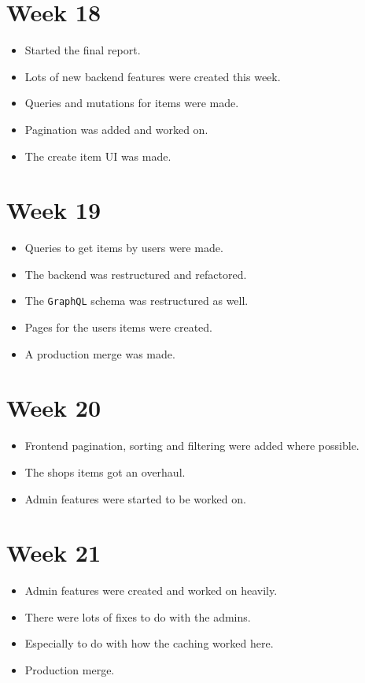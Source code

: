 \documentclass[]{project_report}
\begin{document}
\section{Week 18}
\begin{itemize}
    \item Started the final report.
    \item Lots of new backend features were created this week.
    \item Queries and mutations for items were made.
    \item Pagination was added and worked on.
    \item The create item UI was made.
\end{itemize}

\section{Week 19}
\begin{itemize}
    \item Queries to get items by users were made.
    \item The backend was restructured and refactored.
    \item The \texttt{GraphQL} schema was restructured as well.
    \item Pages for the users items were created.
    \item A production merge was made.
\end{itemize}

\section{Week 20}
\begin{itemize}
    \item Frontend pagination, sorting and filtering were added where possible.
    \item The shops items got an overhaul.
    \item Admin features were started to be worked on.
\end{itemize}

\section{Week 21}
\begin{itemize}
    \item Admin features were created and worked on heavily.
    \item There were lots of fixes to do with the admins.
    \item Especially to do with how the caching worked here.
    \item Production merge.
\end{itemize}
\end{document}
